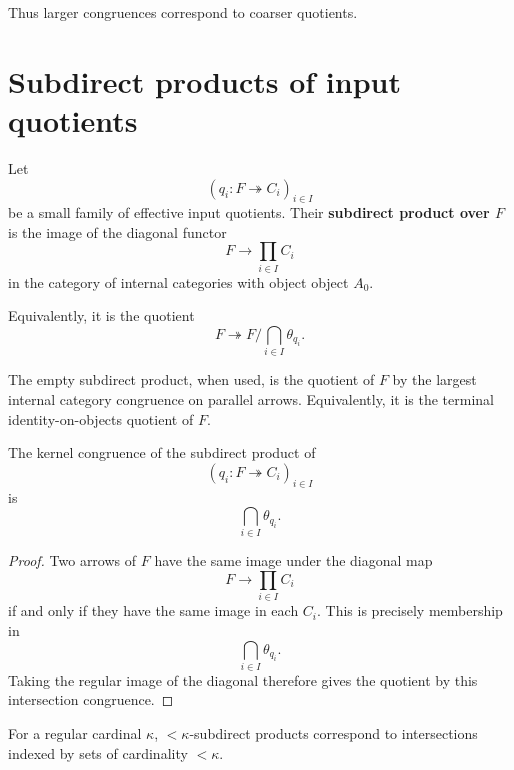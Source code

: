 Thus larger congruences correspond to coarser quotients.

\section{Subdirect products of input quotients}
\label{sec:eilenberg-subdirect-products-input-quotients}

\begin{definition}
\label{def:eilenberg-subdirect-product-input-quotients}
Let
\[
(q_i:F\twoheadrightarrow C_i)_{i\in I}
\]
be a small family of effective input quotients. Their \textbf{subdirect
product over \(F\)} is the image of the diagonal functor
\[
F\longrightarrow
\prod_{i\in I} C_i
\]
in the category of internal categories with object object \(A_0\).

Equivalently, it is the quotient
\[
F\twoheadrightarrow
F/\bigcap_{i\in I}\theta_{q_i}.
\]
\end{definition}

\begin{remark}
\label{rem:eilenberg-empty-subdirect-product}
The empty subdirect product, when used, is the quotient of \(F\) by the
largest internal category congruence on parallel arrows. Equivalently, it is
the terminal identity-on-objects quotient of \(F\).
\end{remark}

\begin{proposition}
\label{prop:eilenberg-kernel-subdirect-product}
The kernel congruence of the subdirect product of
\[
(q_i:F\twoheadrightarrow C_i)_{i\in I}
\]
is
\[
\bigcap_{i\in I}\theta_{q_i}.
\]
\end{proposition}

\begin{proof}
Two arrows of \(F\) have the same image under the diagonal map
\[
F\to\prod_{i\in I}C_i
\]
if and only if they have the same image in each \(C_i\). This is precisely
membership in
\[
\bigcap_{i\in I}\theta_{q_i}.
\]
Taking the regular image of the diagonal therefore gives the quotient by this
intersection congruence.
\end{proof}

\begin{remark}
\label{rem:eilenberg-small-subdirect-products}
For a regular cardinal \(\kappa\), \(<\kappa\)-subdirect products correspond
to intersections indexed by sets of cardinality \(<\kappa\).
\end{remark}


